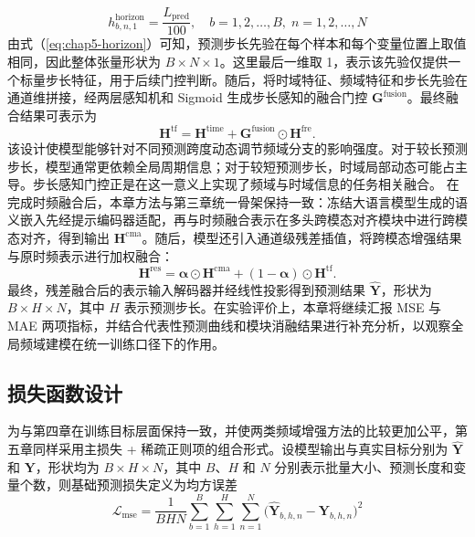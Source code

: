 \begin{equation}
h^{\mathrm{horizon}}_{b,n,1}
=\frac{L_{\mathrm{pred}}}{100},
\quad b=1,2,\dots,B,\; n=1,2,\dots,N
\label{eq:chap5-horizon}
\end{equation}
由式（\ref{eq:chap5-horizon}）可知，预测步长先验在每个样本和每个变量位置上取值相同，因此整体张量形状为 $B\times N\times 1$。这里最后一维取 1，表示该先验仅提供一个标量步长特征，用于后续门控判断。随后，将时域特征、频域特征和步长先验在通道维拼接，经两层感知机和 Sigmoid 生成步长感知的融合门控 $\mathbf{G}^{\mathrm{fusion}}$。最终融合结果可表示为
\begin{equation}
\mathbf{H}^{\text{tf}}=\mathbf{H}^{\text{time}}+\mathbf{G}^{\text{fusion}}\odot \mathbf{H}^{\text{fre}}.
\label{eq:chap5-fusion}
\end{equation}
该设计使模型能够针对不同预测跨度动态调节频域分支的影响强度。对于较长预测步长，模型通常更依赖全局周期信息；对于较短预测步长，时域局部动态可能占主导。步长感知门控正是在这一意义上实现了频域与时域信息的任务相关融合。 在完成时频融合后，本章方法与第三章统一骨架保持一致：冻结大语言模型生成的语义嵌入先经提示编码器适配，再与时频融合表示在多头跨模态对齐模块中进行跨模态对齐，得到输出 $\mathbf{H}^{\mathrm{cma}}$。随后，模型还引入通道级残差插值，将跨模态增强结果与原时频表示进行加权融合：
\begin{equation}
\mathbf{H}^{\mathrm{res}}
=\boldsymbol{\alpha}\odot \mathbf{H}^{\mathrm{cma}}
+(1-\boldsymbol{\alpha})\odot \mathbf{H}^{\mathrm{tf}}.
\label{eq:chap5-residual}
\end{equation}
最终，残差融合后的表示输入解码器并经线性投影得到预测结果 $\hat{\mathbf{Y}}$，形状为 $B\times H\times N$，其中 $H$ 表示预测步长。在实验评价上，本章将继续汇报 MSE 与 MAE 两项指标，并结合代表性预测曲线和模块消融结果进行补充分析，以观察全局频域建模在统一训练口径下的作用。 \subsection{损失函数设计} 为与第四章在训练目标层面保持一致，并使两类频域增强方法的比较更加公平，第五章同样采用主损失 + 稀疏正则项的组合形式。设模型输出与真实目标分别为 $\hat{\mathbf{Y}}$ 和 $\mathbf{Y}$，形状均为 $B\times H\times N$，其中 $B$、$H$ 和 $N$ 分别表示批量大小、预测长度和变量个数，则基础预测损失定义为均方误差
\begin{equation}
\mathcal{L}_{\mathrm{mse}}
= \frac{1}{BHN}\sum_{b=1}^{B}\sum_{h=1}^{H}\sum_{n=1}^{N}
\bigl(\hat{\mathbf{Y}}_{b,h,n}-\mathbf{Y}_{b,h,n}\bigr)^2
\label{eq:chap5-loss-mse}
\end{equation}
